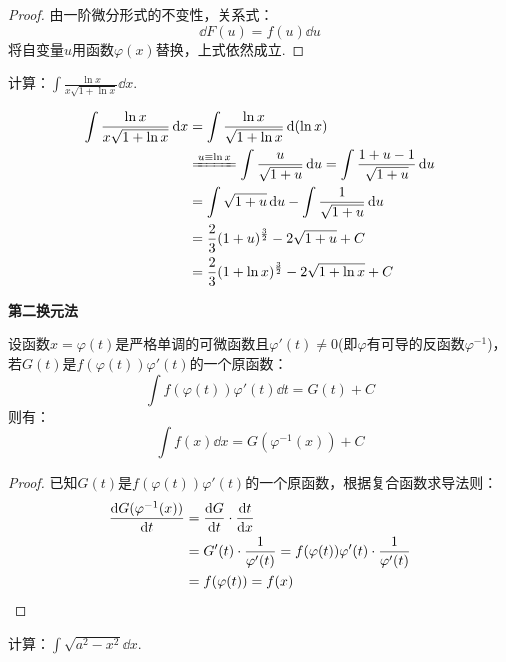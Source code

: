 \begin{proof}
    由一阶微分形式的不变性，关系式：
    \[\dd{F(u)} = f(u)\dd{u}\]
    将自变量$u$用函数$\varphi(x)$替换，上式依然成立.
\end{proof}

\begin{question}
    计算：$\displaystyle\int\frac{\ln x}{x \sqrt{1+\ln x}}\dd{x}$.
\end{question}

\begin{solution}
    \begin{align*}
        \int\frac{\ln x}{x \sqrt{1+\ln x}}\dd{x} &= \int\frac{\ln x}{\sqrt{1+\ln x}}\dd{(\ln x)}\\
        &\xlongequal{u \equiv \ln x} \int\frac{u}{\sqrt{1+u}}\dd{u} = \int\frac{1+u-1}{\sqrt{1+u}}\dd{u}\\
        &= \int\sqrt{1+u}\dd{u} - \int\frac{1}{\sqrt{1+u}}\dd{u}\\
        &= \frac{2}{3}(1+u)^{\frac{3}{2}} - 2\sqrt{1+u} + C\\
        &= \frac{2}{3}(1+\ln x)^{\frac{3}{2}} - 2\sqrt{1+\ln x} + C
    \end{align*}
\end{solution}

\begin{theorem}
    \textbf{第二换元法}

    设函数$x = \varphi(t)$是严格单调的可微函数且$\varphi'(t)\neq 0$(即$\varphi$有可导的反函数$\varphi^{-1}$)，若$G(t)$是$f(\varphi(t))\varphi'(t)$的一个原函数：
    \[\int f(\varphi(t))\varphi'(t)\dd{t} = G(t) + C\]
    则有：
    \[\int f(x)\dd{x} = G(\varphi^{-1}(x)) + C\]
\end{theorem}

\begin{proof}
    已知$G(t)$是$f(\varphi(t))\varphi'(t)$的一个原函数，根据复合函数求导法则：
    \begin{align*}
        \dv{G(\varphi^{-1}(x))}{t} &= \dv{G}{t} \cdot \dv{t}{x} \\
        &= G'(t) \cdot \frac{1}{\varphi'(t)} = f(\varphi(t))\varphi'(t)\cdot\frac{1}{\varphi'(t)} \\
        &= f(\varphi(t)) = f(x)
    \end{align*}
\end{proof}

\begin{question}
    计算：$\displaystyle \int \sqrt{a^2-x^2}\dd{x}$.
\end{question}

